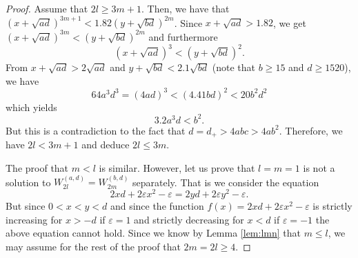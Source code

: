 \documentclass{amsart}
\theoremstyle{definition}
\begin{document}
\begin{proof}
Assume that $2l\ge 3m+1$. Then, we have that $(x+\sqrt{ad})^{3m+1}<1.82(y+\sqrt{bd})^{2m}$. Since $x+\sqrt{ad}>1.82$, we get $(x+\sqrt{ad})^{3m}<(y+\sqrt{bd})^{2m}$ and furthermore 
$$
(x+\sqrt{ad})^{3}<(y+\sqrt{bd})^{2}.
$$ 
From $x+\sqrt{ad}>2\sqrt{ad}$ and $y+\sqrt{bd}<2.1\sqrt{bd}$ (note that $b\geq 15$ and $d\geq 1520$), we have 
$$
64a^3d^3=(4ad)^3 <(4.41bd)^2<20b^2d^2
$$
which yields 
$$
3.2a^3d<b^2. 
$$
But this is a contradiction to the fact that $d=d_+ > 4abc >4ab^2.$ Therefore, we have $2l < 3m+1$ and deduce $2l\le 3m$. 

The proof that $m<l$ is similar. However, let us prove that $l=m=1$ is not a solution to $W^{(a,d)}_{2l} = W^{(b,d)}_{2m}$ separately. That is
we consider the equation
$$2xd+2\varepsilon x^2-\varepsilon=2yd+2\varepsilon y^2-\varepsilon.$$
But since $0<x<y<d$ and since the function $f(x)=2xd+2\varepsilon x^2-\varepsilon$ is strictly increasing for $x>-d$ if $\varepsilon=1$ and strictly decreasing for $x<d$ if $\varepsilon=-1$
the above equation cannot hold. Since we know by Lemma \ref{lem:lmn} that $m\leq l$, we may assume for the rest of the proof that $2m=2l\geq 4$.


\end{proof}
\end{document}
